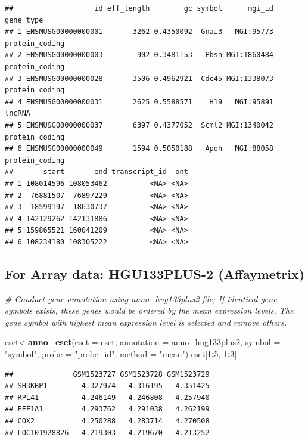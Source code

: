 \documentclass[
  12pt,
]{book}
\newenvironment{Shaded}{\begin{snugshade}}{\end{snugshade}}
\newcommand{\AttributeTok}[1]{\textcolor[rgb]{0.13,0.29,0.53}{#1}}
\newcommand{\CommentTok}[1]{\textcolor[rgb]{0.56,0.35,0.01}{\textit{#1}}}
\newcommand{\DecValTok}[1]{\textcolor[rgb]{0.00,0.00,0.81}{#1}}
\newcommand{\FunctionTok}[1]{\textcolor[rgb]{0.13,0.29,0.53}{\textbf{#1}}}
\newcommand{\NormalTok}[1]{#1}
\newcommand{\OtherTok}[1]{\textcolor[rgb]{0.56,0.35,0.01}{#1}}
\newcommand{\SpecialCharTok}[1]{\textcolor[rgb]{0.81,0.36,0.00}{\textbf{#1}}}
\newcommand{\StringTok}[1]{\textcolor[rgb]{0.31,0.60,0.02}{#1}}
\theoremstyle{definition}
\theoremstyle{definition}
\theoremstyle{definition}
\theoremstyle{definition}
\theoremstyle{remark}
\begin{document}
\begin{verbatim}
##                   id eff_length        gc symbol      mgi_id      gene_type
## 1 ENSMUSG00000000001       3262 0.4350092  Gnai3   MGI:95773 protein_coding
## 2 ENSMUSG00000000003        902 0.3481153   Pbsn MGI:1860484 protein_coding
## 3 ENSMUSG00000000028       3506 0.4962921  Cdc45 MGI:1338073 protein_coding
## 4 ENSMUSG00000000031       2625 0.5588571    H19   MGI:95891         lncRNA
## 5 ENSMUSG00000000037       6397 0.4377052  Scml2 MGI:1340042 protein_coding
## 6 ENSMUSG00000000049       1594 0.5050188   Apoh   MGI:88058 protein_coding
##       start       end transcript_id  ont
## 1 108014596 108053462          <NA> <NA>
## 2  76881507  76897229          <NA> <NA>
## 3  18599197  18630737          <NA> <NA>
## 4 142129262 142131886          <NA> <NA>
## 5 159865521 160041209          <NA> <NA>
## 6 108234180 108305222          <NA> <NA>
\end{verbatim}

\hypertarget{for-array-data-hgu133plus-2-affaymetrix}{%
\subsection{For Array data: HGU133PLUS-2 (Affaymetrix)}\label{for-array-data-hgu133plus-2-affaymetrix}}

\begin{Shaded}
\begin{Highlighting}[]
\CommentTok{\# Conduct gene annotation using \textasciigrave{}anno\_hug133plus2\textasciigrave{} file; If identical gene symbols exists, these genes would be ordered by the mean expression levels. The gene symbol with highest mean expression level is selected and remove others. }

\NormalTok{eset}\OtherTok{\textless{}{-}}\FunctionTok{anno\_eset}\NormalTok{(}\AttributeTok{eset       =}\NormalTok{ eset,}
                \AttributeTok{annotation =}\NormalTok{ anno\_hug133plus2,}
                \AttributeTok{symbol     =} \StringTok{"symbol"}\NormalTok{,}
                \AttributeTok{probe      =} \StringTok{"probe\_id"}\NormalTok{,}
                \AttributeTok{method     =} \StringTok{"mean"}\NormalTok{)}
\NormalTok{eset[}\DecValTok{1}\SpecialCharTok{:}\DecValTok{5}\NormalTok{, }\DecValTok{1}\SpecialCharTok{:}\DecValTok{3}\NormalTok{]}
\end{Highlighting}
\end{Shaded}

\begin{verbatim}
##              GSM1523727 GSM1523728 GSM1523729
## SH3KBP1        4.327974   4.316195   4.351425
## RPL41          4.246149   4.246808   4.257940
## EEF1A1         4.293762   4.291038   4.262199
## COX2           4.250288   4.283714   4.270508
## LOC101928826   4.219303   4.219670   4.213252
\end{verbatim}
\end{document}
